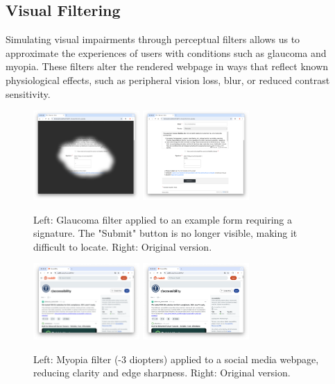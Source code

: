 \subsection{Visual Filtering}

Simulating visual impairments through perceptual filters allows us to approximate the experiences of users with conditions such as glaucoma and myopia. These filters alter the rendered webpage in ways that reflect known physiological effects, such as peripheral vision loss, blur, or reduced contrast sensitivity.

\begin{figure}
    \centering
    \includegraphics[width=115pt]{imgs/glaucoma-filter.png}
    \includegraphics[width=115pt]{imgs/no-glaucoma-filter.png}
    \caption{Left: Glaucoma filter applied to an example form requiring a signature. The "Submit" button is no longer visible, making it difficult to locate. Right: Original version.}
    \label{fig:glaucoma-filters}
\end{figure}

\begin{figure}
    \centering
    \includegraphics[width=115pt]{imgs/myopia-filter.png}
    \includegraphics[width=115pt]{imgs/no-myopia-filter.png}
    \caption{Left: Myopia filter (-3 diopters) applied to a social media webpage, reducing clarity and edge sharpness. Right: Original version.}
    \label{fig:myopia-filters}
\end{figure}

